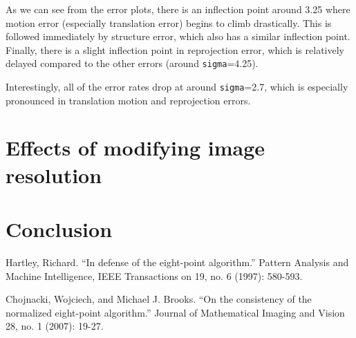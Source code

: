 \documentclass{article}
\begin{document}
As we can see from the error plots, there is an inflection point around 3.25 where motion error (especially translation error) begins to climb drastically. This is followed immediately by structure error, which also has a similar inflection point. Finally, there is a slight inflection point in reprojection error, which is relatively delayed compared to the other errors (around \texttt{sigma}=4.25).

Interestingly, all of the error rates drop at around \texttt{sigma}=2.7, which is especially pronounced in translation motion and reprojection errors.







\newpage
\section{Effects of modifying image resolution}

\newpage
\section{Conclusion}

\newpage


\newpage
\begin{thebibliography}{99}
	Hartley, Richard. ``In defense of the eight-point algorithm.'' Pattern Analysis and Machine Intelligence, IEEE Transactions on 19, no. 6 (1997): 580-593.

	Chojnacki, Wojciech, and Michael J. Brooks. ``On the consistency of the normalized eight-point algorithm.'' Journal of Mathematical Imaging and Vision 28, no. 1 (2007): 19-27.
\end{thebibliography}
\end{document}
